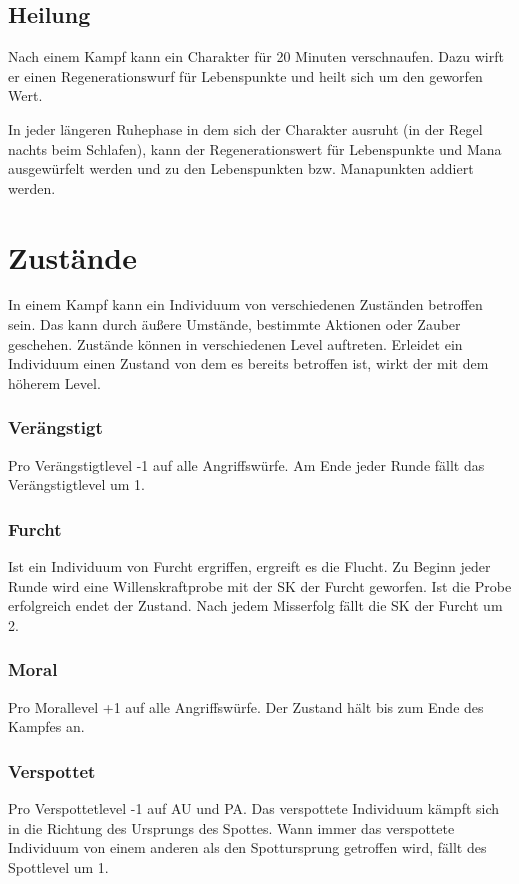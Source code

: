 \documentclass[../../Heldenanleitung2]{subfiles}
\begin{document}
\subsection{Heilung}
Nach einem Kampf kann ein Charakter für 20 Minuten verschnaufen. Dazu wirft er einen Regenerationswurf für Lebenspunkte und heilt sich um den geworfen Wert.

In jeder längeren Ruhephase in dem sich der Charakter ausruht (in der Regel nachts beim Schlafen), kann der Regenerationswert für Lebenspunkte und Mana ausgewürfelt werden und zu den Lebenspunkten bzw. Manapunkten addiert werden.

\section{Zustände}

In einem Kampf kann ein Individuum von verschiedenen Zuständen betroffen sein. Das kann durch äußere Umstände, bestimmte Aktionen oder Zauber geschehen. Zustände können in verschiedenen Level auftreten. Erleidet ein Individuum einen Zustand von dem es bereits betroffen ist, wirkt der mit dem höherem Level.

\subsubsection{Verängstigt}
Pro Verängstigtlevel -1 auf alle Angriffswürfe. Am Ende jeder Runde fällt das Verängstigtlevel um 1.

\subsubsection{Furcht}
Ist ein Individuum von Furcht ergriffen, ergreift es die Flucht. Zu Beginn jeder Runde wird eine Willenskraftprobe mit der SK der Furcht geworfen. Ist die Probe erfolgreich endet der Zustand. Nach jedem Misserfolg fällt die SK der Furcht um 2.

\subsubsection{Moral}
Pro Morallevel +1 auf alle Angriffswürfe. Der Zustand hält bis zum Ende des Kampfes an.

\subsubsection{Verspottet}
Pro Verspottetlevel -1 auf AU und PA. Das verspottete Individuum kämpft sich in die Richtung des Ursprungs des Spottes. Wann immer das verspottete Individuum von einem anderen als den Spottursprung getroffen wird, fällt des Spottlevel um 1.
\end{document}
